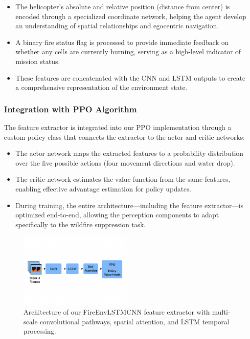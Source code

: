 \documentclass[conference]{IEEEtran}
\begin{document}
\begin{itemize}
    \item The helicopter's absolute and relative position (distance from center) is encoded through a specialized coordinate network, helping the agent develop an understanding of spatial relationships and egocentric navigation.
    
    \item A binary fire status flag is processed to provide immediate feedback on whether any cells are currently burning, serving as a high-level indicator of mission status.
    
    \item These features are concatenated with the CNN and LSTM outputs to create a comprehensive representation of the environment state.
\end{itemize}

\subsubsection{Integration with PPO Algorithm}
The feature extractor is integrated into our PPO implementation through a custom policy class that connects the extractor to the actor and critic networks:

\begin{itemize}
    \item The actor network maps the extracted features to a probability distribution over the five possible actions (four movement directions and water drop).
    
    \item The critic network estimates the value function from the same features, enabling effective advantage estimation for policy updates.
    
    \item During training, the entire architecture—including the feature extractor—is optimized end-to-end, allowing the perception components to adapt specifically to the wildfire suppression task.
\end{itemize}

\begin{figure}[H]
    \centering
    \includegraphics[width=0.5\textwidth]{feat_extr.png}
    \caption{Architecture of our FireEnvLSTMCNN feature extractor with multi-scale convolutional pathways, spatial attention, and LSTM temporal processing.}
    \end{figure}
\end{document}
